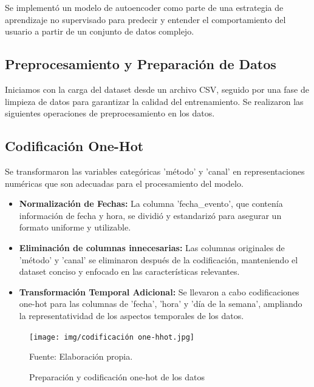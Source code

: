 Se implementó un modelo de autoencoder como parte de una estrategia de aprendizaje no supervisado para predecir y entender el comportamiento del usuario a partir de un conjunto de datos complejo.

\subsection{Preprocesamiento y Preparación de Datos}

Iniciamos con la carga del dataset desde un archivo CSV, seguido por una fase de limpieza de datos para garantizar la calidad del entrenamiento. Se realizaron las siguientes operaciones de preprocesamiento en los datos.

\subsection{Codificación One-Hot}

Se transformaron las variables categóricas 'método' y 'canal' en representaciones numéricas que son adecuadas para el procesamiento del modelo.

\begin{itemize}
    \item \textbf{Normalización de Fechas:} La columna 'fecha\_evento', que contenía información de fecha y hora, se dividió y estandarizó para asegurar un formato uniforme y utilizable.
    \item \textbf{Eliminación de columnas innecesarias:} Las columnas originales de 'método' y 'canal' se eliminaron después de la codificación, manteniendo el dataset conciso y enfocado en las características relevantes.
    \item \textbf{Transformación Temporal Adicional:} Se llevaron a cabo codificaciones one-hot para las columnas de 'fecha', 'hora' y 'día de la semana', ampliando la representatividad de los aspectos temporales de los datos.
\end{itemize}

\begin{figure}[H]
    \begin{minipage}[t]{0.9\textwidth}
        \caption{Preparación y codificación one-hot de los datos}
        \label{codificación_autoencoder}        
    \end{minipage}

    \vspace{10pt}

    \begin{minipage}[b]{0.9\textwidth}
        \centering
        \texttt{[image: img/codificación one-hhot.jpg]}        
    \end{minipage}

    \begin{minipage}[t]{0.9\textwidth}
        Fuente: Elaboración propia.
    \end{minipage}
\end{figure}


